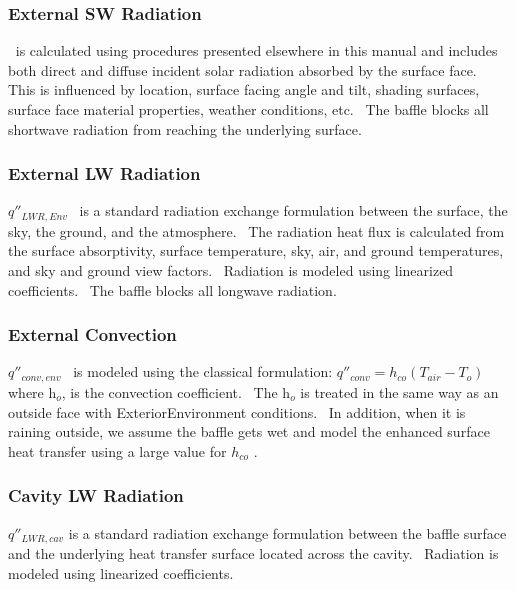 \subsubsection{External SW Radiation}\label{external-sw-radiation}

\(_{ }\)~is calculated using procedures presented elsewhere in this manual and includes both direct and diffuse incident solar radiation absorbed by the surface face.~ This is influenced by location, surface facing angle and tilt, shading surfaces, surface face material properties, weather conditions, etc.~ The baffle blocks all shortwave radiation from reaching the underlying surface.

\subsubsection{External LW Radiation}\label{external-lw-radiation}

\({q''_{LWR,Env}}\) ~is a standard radiation exchange formulation between the surface, the sky, the ground, and the atmosphere.~ The radiation heat flux is calculated from the surface absorptivity, surface temperature, sky, air, and ground temperatures, and sky and ground view factors.~ Radiation is modeled using linearized coefficients. ~The baffle blocks all longwave radiation.

\subsubsection{External Convection}\label{external-convection}

\(q''_{conv,env}\) ~is modeled using the classical formulation: \(q''_{conv}  = h_{co}(T_{air} - T_{o})\) where h\(_{o}\), is the convection coefficient.~ The h\(_{o}\) is treated in the same way as an outside face with ExteriorEnvironment conditions.~ In addition, when it is raining outside, we assume the baffle gets wet and model the enhanced surface heat transfer using a large value for \({h_{co}}\) .

\subsubsection{Cavity LW Radiation}\label{cavity-lw-radiation}

\({q''_{LWR,cav}}\) is a standard radiation exchange formulation between the baffle surface and the underlying heat transfer surface located across the cavity.~ Radiation is modeled using linearized coefficients.

